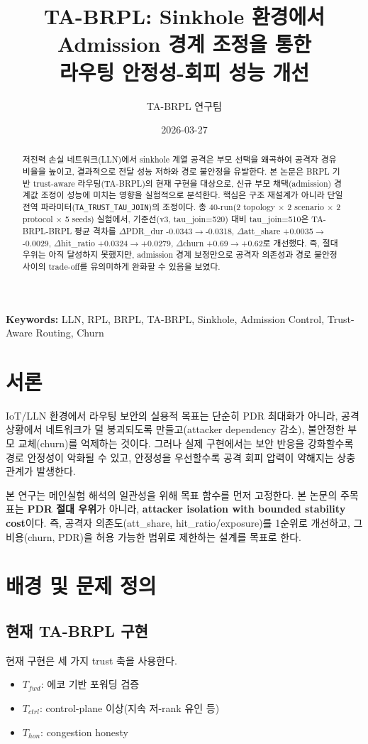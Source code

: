 \documentclass[12pt,a4paper]{article}
\title{TA-BRPL: Sinkhole 환경에서 Admission 경계 조정을 통한\\
라우팅 안정성-회피 성능 개선}
\author{TA-BRPL 연구팀}
\date{2026-03-27}
\begin{document}
\maketitle

\begin{abstract}
저전력 손실 네트워크(LLN)에서 sinkhole 계열 공격은 부모 선택을 왜곡하여 공격자 경유 비율을 높이고,
결과적으로 전달 성능 저하와 경로 불안정을 유발한다.
본 논문은 BRPL 기반 trust-aware 라우팅(TA-BRPL)의 현재 구현을 대상으로,
신규 부모 채택(admission) 경계값 조정이 성능에 미치는 영향을 실험적으로 분석한다.
핵심은 구조 재설계가 아니라 단일 전역 파라미터(\texttt{TA\_TRUST\_TAU\_JOIN})의 조정이다.
총 40-run(2 topology $\times$ 2 scenario $\times$ 2 protocol $\times$ 5 seeds) 실험에서,
기준선(v3, tau\_join=520) 대비 tau\_join=510은
TA-BRPL-BRPL 평균 격차를
$\Delta$PDR\_dur -0.0343$\rightarrow$-0.0318,
$\Delta$att\_share +0.0035$\rightarrow$-0.0029,
$\Delta$hit\_ratio +0.0324$\rightarrow$+0.0279,
$\Delta$churn +0.69$\rightarrow$+0.62로 개선했다.
즉, 절대 우위는 아직 달성하지 못했지만,
admission 경계 보정만으로 공격자 의존성과 경로 불안정 사이의 trade-off를 유의미하게 완화할 수 있음을 보였다.
\end{abstract}

\noindent\textbf{Keywords:}
LLN, RPL, BRPL, TA-BRPL, Sinkhole, Admission Control, Trust-Aware Routing, Churn

\section{서론}
IoT/LLN 환경에서 라우팅 보안의 실용적 목표는 단순히 PDR 최대화가 아니라,
공격 상황에서 네트워크가 덜 붕괴되도록 만들고(attacker dependency 감소),
불안정한 부모 교체(churn)를 억제하는 것이다.
그러나 실제 구현에서는 보안 반응을 강화할수록 경로 안정성이 악화될 수 있고,
안정성을 우선할수록 공격 회피 압력이 약해지는 상충관계가 발생한다.

본 연구는 메인실험 해석의 일관성을 위해 목표 함수를 먼저 고정한다.
본 논문의 주목표는 \textbf{PDR 절대 우위}가 아니라,
\textbf{attacker isolation with bounded stability cost}이다.
즉, 공격자 의존도(att\_share, hit\_ratio/exposure)를 1순위로 개선하고,
그 비용(churn, PDR)을 허용 가능한 범위로 제한하는 설계를 목표로 한다.

\section{배경 및 문제 정의}
\subsection{현재 TA-BRPL 구현}
현재 구현은 세 가지 trust 축을 사용한다.
\begin{itemize}
  \item $T_{fwd}$: 에코 기반 포워딩 검증
  \item $T_{ctrl}$: control-plane 이상(지속 저-rank 유인 등)
  \item $T_{hon}$: congestion honesty
\end{itemize}
\end{document}
